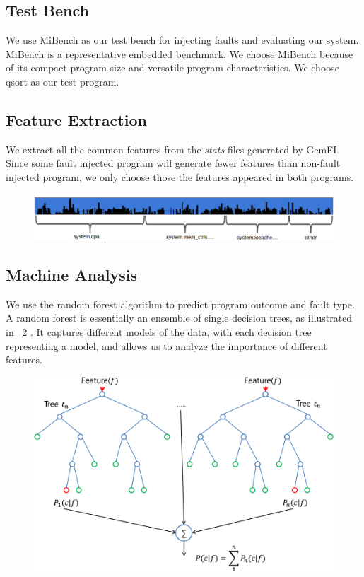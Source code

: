 \documentclass{sig-alternate}
\begin{document}
\subsection{Test Bench}
We use MiBench \cite{guthaus2001mibench} as our test bench for injecting faults and evaluating our system. MiBench is a representative embedded benchmark. We choose MiBench because of its compact program size and versatile program characteristics. We choose qsort as our test program.

\subsection{Feature Extraction}
We extract all the common features from the \emph{stats} files generated by GemFI. Since some fault injected program will generate fewer features than non-fault injected program, we only choose those the features appeared in both programs.
\begin{figure}[t]
\begin{center}
   \includegraphics[width=0.95\linewidth]{./figures/feat_dist.png}
\end{center}
   \caption{}
\label{fig:feat-dist}
\end{figure}

\subsection{Machine Analysis}
We use the random forest algorithm to predict program outcome and fault type. A random forest is essentially an ensemble of single decision trees, as illustrated in ~\ref{fig:rf} \cite{breiman2001random}. It captures different models of the data, with each decision tree representing a model, and allows us to analyze the importance of different features. 

\begin{figure}[t]
\begin{center}
   \includegraphics[width=0.95\linewidth]{./figures/rf.png}
\end{center}
   \caption{}
\label{fig:rf}
\end{figure}
\end{document}
